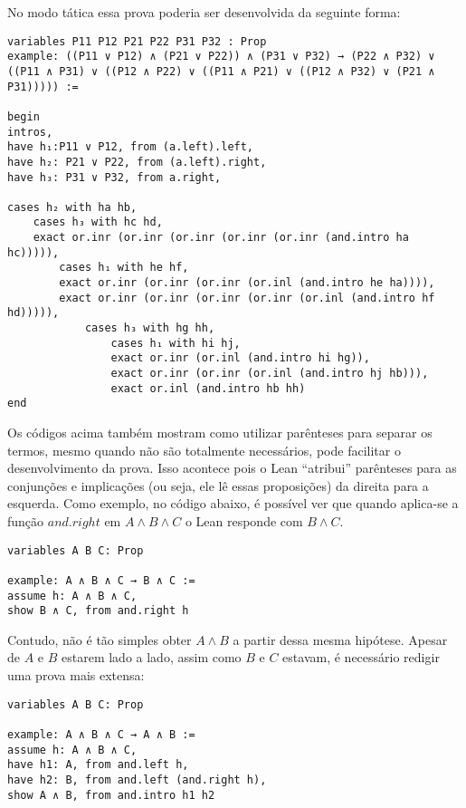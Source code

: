 No modo tática essa prova poderia ser desenvolvida da seguinte forma:

\begin{lstlisting}
variables P11 P12 P21 P22 P31 P32 : Prop
example: ((P11 ∨ P12) ∧ (P21 ∨ P22)) ∧ (P31 ∨ P32) → (P22 ∧ P32) ∨ ((P11 ∧ P31) ∨ ((P12 ∧ P22) ∨ ((P11 ∧ P21) ∨ ((P12 ∧ P32) ∨ (P21 ∧ P31))))) :=

begin
intros,
have h₁:P11 ∨ P12, from (a.left).left,
have h₂: P21 ∨ P22, from (a.left).right,
have h₃: P31 ∨ P32, from a.right,

cases h₂ with ha hb,
    cases h₃ with hc hd,
    exact or.inr (or.inr (or.inr (or.inr (or.inr (and.intro ha hc))))),
        cases h₁ with he hf,
        exact or.inr (or.inr (or.inr (or.inl (and.intro he ha)))),
        exact or.inr (or.inr (or.inr (or.inr (or.inl (and.intro hf hd))))),
            cases h₃ with hg hh,
                cases h₁ with hi hj,
                exact or.inr (or.inl (and.intro hi hg)),
                exact or.inr (or.inr (or.inl (and.intro hj hb))),
                exact or.inl (and.intro hb hh)
end
\end{lstlisting}

Os códigos acima também mostram como utilizar parênteses para separar os termos, mesmo quando não são totalmente necessários, pode facilitar o desenvolvimento da prova. Isso acontece pois o Lean ``atribui'' parênteses para as conjunções e implicações (ou seja, ele lê essas proposições) da direita para a esquerda. Como exemplo, no código abaixo, é possível ver que quando aplica-se a função $and.right$ em $A \land B \land C$ o Lean responde com $B \land C$.

\begin{lstlisting}
variables A B C: Prop

example: A ∧ B ∧ C → B ∧ C :=
assume h: A ∧ B ∧ C,
show B ∧ C, from and.right h
\end{lstlisting}


Contudo, não é tão simples obter $A \land B$ a partir dessa mesma hipótese. Apesar de $A$ e $B$ estarem lado a lado, assim como $B$ e $C$ estavam, é necessário redigir uma prova mais extensa:

\begin{lstlisting}
variables A B C: Prop

example: A ∧ B ∧ C → A ∧ B :=
assume h: A ∧ B ∧ C,
have h1: A, from and.left h,
have h2: B, from and.left (and.right h),
show A ∧ B, from and.intro h1 h2
\end{lstlisting}

